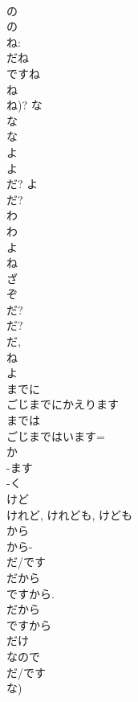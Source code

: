 \documentclass[8pt]{extreport}
\begin{document}
\begin{CJK}{UTF8}{min}
\\	の 
\\	の 
\\	ね: 
\\	だね 
\\	ですね 
\\	ね 
\\	ね)?	な 
\\	な 
\\	な	
\\	よ	
\\	よ	
\\	だ?	よ	
\\	だ?	
\\	わ	
\\	わ 
\\	よ 
\\	ね 
\\	ざ 
\\	ぞ 
\\	だ?	
\\	だ?	
\\	だ, 
\\	ね 
\\	よ	
\\	までに		
\\	ごじまでにかえります 
\\	までは		
\\	ごじまではいます=
\\	か 
\\	-ます 
\\	-く 
\\	けど 
\\	けれど, けれども, けども	
\\	から 
\\	から-
\\	だ/です 
\\	だから 
\\	ですから.	
\\	だから		
\\	ですから		
\\	だけ		
\\	なので 
\\	だ/です 
\\	な)		
\end{CJK}
\end{document}
